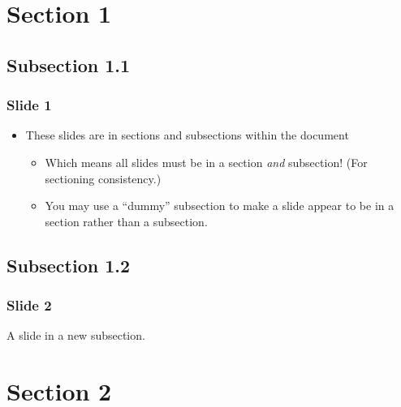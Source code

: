 \documentclass[t,english]{beamer}
\begin{document}

\section*{Section 1}



\subsection*{Subsection 1.1}

\begin{frame}[fragile]
\frametitle{Slide 1}

\begin{itemize}[<+-| alert@+>]

\item These slides are in sections and subsections within the document
\begin{itemize}[<+-| alert@+>]

\item Which means all slides must be in a section
\emph{and} subsection! (For sectioning consistency.)

\item You may use a ``dummy'' subsection to make a slide appear to be in a
section rather than a subsection.
\end{itemize}
\end{itemize}
\end{frame}



\subsection*{Subsection 1.2}

\begin{frame}[fragile]
\frametitle{Slide 2}


A slide in a new subsection.
\end{frame}



\section*{Section 2}
\end{document}
